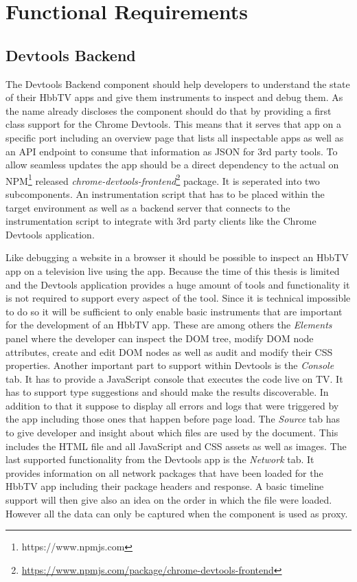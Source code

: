 \section{Functional Requirements\label{sec:reqsuba}}

\subsection{Devtools Backend}

The Devtools Backend component should help developers to understand the state of their HbbTV
apps and give them instruments to inspect and debug them. As the name already discloses
the component should do that by providing a first class support for the Chrome Devtools.
This means that it serves that app on a specific port including an overview page that lists
all inspectable apps as well as an API endpoint to consume that information as JSON for
3rd party tools. To allow seamless updates the app should be a direct dependency to the actual
on NPM\footnote{https://www.npmjs.com} released \textit{chrome-devtools-frontend}\footnote{\url{https://www.npmjs.com/package/chrome-devtools-frontend}}
package. It is seperated into two subcomponents. An instrumentation script that has to be
placed within the target environment as well as a backend server that connects to the
instrumentation script to integrate with 3rd party clients like the Chrome Devtools application.

Like debugging a website in a browser it should be possible to inspect an HbbTV app on a
television live using the app. Because the time of this thesis is limited and the Devtools
application provides a huge amount of tools and functionality it is not required to support
every aspect of the tool. Since it is technical impossible to do so it will be sufficient to
only enable basic instruments that are important for the development of an HbbTV app. These
are among others the \textit{Elements} panel where the developer can inspect the DOM tree,
modify DOM node attributes, create and edit DOM nodes as well as audit and modify their
CSS properties. Another important part to support within Devtools is the \textit{Console}
tab. It has to provide a JavaScript console that executes the code live on TV. It has to
support type suggestions and should make the results discoverable. In addition to that it
suppose to display all errors and logs that were triggered by the app including those ones
that happen before page load. The \textit{Source} tab has to give developer and insight
about which files are used by the document. This includes the HTML file and all JavaScript
and CSS assets as well as images. The last supported functionality from the Devtools app is
the \textit{Network} tab. It provides information on all network packages that have been
loaded for the HbbTV app including their package headers and response. A basic timeline support
will then give also an idea on the order in which the file were loaded. However all the data
can only be captured when the component is used as proxy.

